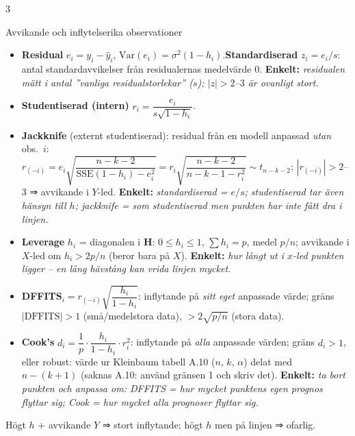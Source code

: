 \documentclass[8pt]{extarticle}
\makeatletter
\newcounter{sect}
\newcommand{\sect}[3][hd]{\par\vspace{1.5pt}\refstepcounter{sect}\noindent
  {\setlength{\fboxsep}{1.8pt}\colorbox{#1}{\parbox{\dimexpr\linewidth-2\fboxsep}{\color{white}\sffamily\bfseries
  \strut\thesect\enspace #2}}}\label{#3}\par\nobreak\vspace{0.8pt}\@afterheading}
\newcommand{\enk}[1]{{\color{cEnk}\sffamily\bfseries Enkelt:} {\itshape #1}}
\newcommand{\SSE}{\mathrm{SSE}}
\newlength{\figunit}\setlength{\figunit}{1.07cm}%
\newcommand{\miniram}[2][1.6]{%
  \draw[gray!60] (0,-0.5) rectangle (#1,0.5);
  \node[font=\fontsize{5}{5.6}\selectfont\sffamily,anchor=north,align=center] at ({#1/2},-0.5) {#2};}
\newenvironment{figrad}{\par\vspace{1.5pt}\centering}{\par\vspace{1.5pt}}%
\makeatother
\begin{document}
\begin{multicols*}{3}
\sect[cDiag]{Avvikande och inflytelserika observationer}{sec:infl}
\begin{itemize}
\item \textbf{Residual} $e_i=y_i-\hat y_i$,\; $\mathrm{Var}(e_i)=\sigma^2(1-h_i)$.\quad \textbf{Standardiserad} $z_i=e_i/s$: antal standardavvikelser från residualernas medelvärde 0. \enk{residualen mätt i antal ”vanliga residualstorlekar” ($s$); $|z|>2$–$3$ är ovanligt stort.}
\item \textbf{Studentiserad (intern)} $r_i=\dfrac{e_i}{s\sqrt{1-h_i}}$.
\item \textbf{Jackknife} (externt studentiserad): residual från en modell anpassad \emph{utan} obs.\ $i$:\\
$r_{(-i)}=e_i\sqrt{\dfrac{n-k-2}{\SSE(1-h_i)-e_i^2}}=r_i\sqrt{\dfrac{n-k-2}{n-k-1-r_i^2}}\sim t_{n-k-2}$;\; $|r_{(-i)}|>2$–3 ⇒ avvikande i $Y$-led. \enk{standardiserad = $e/s$; studentiserad tar även hänsyn till $h$; jackknife = som studentiserad men punkten har inte fått dra i linjen.}
\item \textbf{Leverage} $h_i$ = diagonalen i $\mathbf H$: $0\le h_i\le1$, $\sum h_i=p$, medel $p/n$; avvikande i $X$-led om $h_i>2p/n$ (beror bara på $X$). \enk{hur långt ut i $x$-led punkten ligger – en lång hävstång kan vrida linjen mycket.}
\item \textbf{DFFITS}$_i=r_{(-i)}\sqrt{\dfrac{h_i}{1-h_i}}$: inflytande på \emph{sitt eget} anpassade värde; gräns $|\text{DFFITS}|>1$ (små/medelstora data), $>2\sqrt{p/n}$ (stora data).
\item \textbf{Cook's} $d_i=\dfrac1p\cdot\dfrac{h_i}{1-h_i}\cdot r_i^2$: inflytande på \emph{alla} anpassade värden; gräns $d_i>1$, eller robust: värde ur Kleinbaum tabell A.10 ($n$, $k$, $\alpha$) delat med $n-(k+1)$ (saknas A.10: använd gränsen 1 och skriv det). \enk{ta bort punkten och anpassa om: DFFITS = hur mycket punktens egen prognos flyttar sig; Cook = hur mycket alla prognoser flyttar sig.}
\end{itemize}
Högt $h$ + avvikande $Y$ ⇒ stort inflytande; högt $h$ men på linjen ⇒ ofarlig.
\begin{figrad}
\end{figrad}
\end{multicols*}
\end{document}
